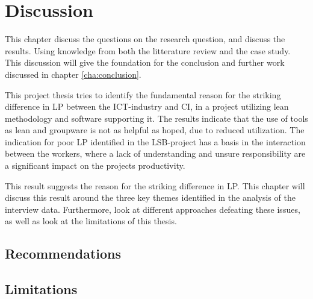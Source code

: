 
\chapter{Discussion} \label{cha:discussion}
This chapter discuss the questions on the research question, and discuss the results. Using knowledge from both the litterature review and the case study. This discussion will give the foundation for the conclusion and further work discussed in chapter \ref{cha:conclusion}. 

This project thesis tries to identify the fundamental reason for the striking difference in LP between the ICT-industry and CI, in a project utilizing lean methodology and software supporting it. The results indicate that the use of tools as lean and groupware is not as helpful as hoped, due to reduced utilization. The indication for poor LP identified in the LSB-project has a basis in the interaction between the workers, where a lack of understanding and unsure responsibility are a significant impact on the projects productivity. 

This result suggests the reason for the striking difference in LP. This chapter will discuss this result around the three key themes identified in the analysis of the interview data. Furthermore, look at different approaches defeating these issues, as well as look at the limitations of this thesis.


\section{Recommendations}

\section{Limitations}


\cleardoublepage